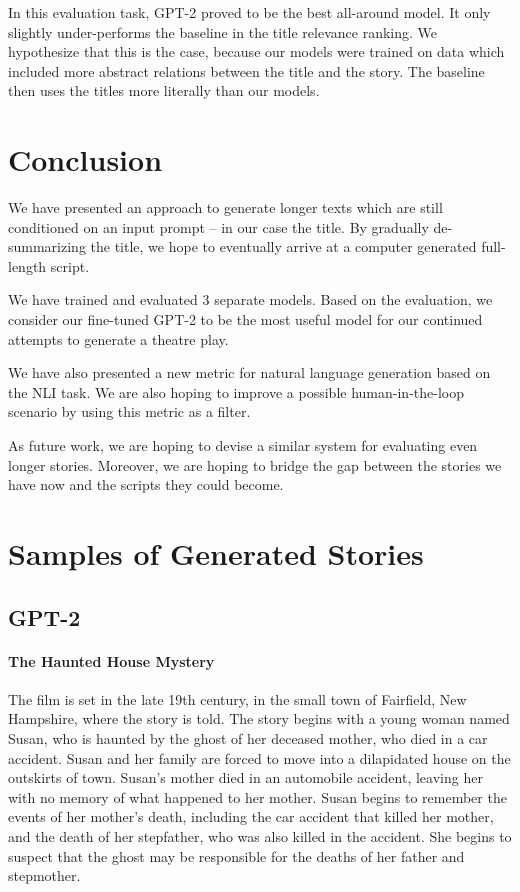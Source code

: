 \documentclass[11pt,a4paper]{article}
\begin{document}
In this evaluation task, GPT-2 proved to be the best all-around model. It only slightly under-performs the baseline in the title relevance ranking. We hypothesize that this is the case, because our models were trained on data which included more abstract relations between the title and the story. The baseline then uses the titles more literally than our models.


\section{Conclusion}
We have presented an approach to generate longer texts which are still conditioned on an input prompt -- in our case the title. By gradually de-summarizing the title, we hope to eventually arrive at a computer generated full-length script.

We have trained and evaluated 3 separate models. Based on the evaluation, we consider our fine-tuned GPT-2 to be the most useful model for our continued attempts to generate a theatre play.

We have also presented a new metric for natural language generation based on the NLI task. We are also hoping to improve a possible human-in-the-loop scenario by using this metric as a filter.

As future work, we are hoping to devise a similar system for evaluating even longer stories. Moreover, we are hoping to bridge the gap between the stories we have now and the scripts they could become.





\appendix

\section{Samples of Generated Stories}
\label{sec:appendix}
\subsection{GPT-2}
\paragraph{The Haunted House Mystery}
The film is set in the late 19th century, in the small town of Fairfield, New Hampshire, where the story is told. The story begins with a young woman named Susan, who is haunted by the ghost of her deceased mother, who died in a car accident. Susan and her family are forced to move into a dilapidated house on the outskirts of town.
Susan's mother died in an automobile accident, leaving her with no memory of what happened to her mother. Susan begins to remember the events of her mother's death, including the car accident that killed her mother, and the death of her stepfather, who was also killed in the accident. She begins to suspect that the ghost may be responsible for the deaths of her father and stepmother.
\end{document}
